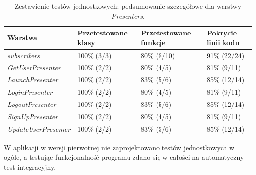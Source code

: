 \begin{table}[!htb]
\centering
\caption{Zestawienie testów jednostkowych: podsumowanie szczegółowe dla warstwy \textit{Presenters}.}
\label{tab:testy_jednostkowe_presenters}
\begin{tabular}{|l|l|l|l|}
\hline
\textbf{Warstwa} & \textbf{Przetestowane klasy} & \textbf{Przetestowane funkcje} & \textbf{Pokrycie linii kodu} \\ \hline
\textit{subscribers} & 100\% (3/3) & 80\% (8/10) & 91\% (22/24)	\\ \hline
\textit{GetUserPresenter} & 100\% (2/2) & 80\% (4/5) & 81\% (9/11)	\\ \hline
\textit{LaunchPresenter} & 100\% (2/2) & 83\% (5/6) & 85\% (12/14)	\\ \hline
\textit{LoginPresenter} & 100\% (2/2) & 80\% (4/5) & 81\% (9/11)	\\ \hline
\textit{LogoutPresenter} & 100\% (2/2) & 83\% (5/6) & 85\% (12/14)	\\ \hline
\textit{SignUpPresenter} & 100\% (2/2) & 80\% (4/5) & 81\% (9/11)	\\ \hline
\textit{UpdateUserPresenter} & 100\% (2/2) & 83\% (5/6) & 85\% (12/14)	\\ \hline
\end{tabular}
\end{table}

%
%

W aplikacji w wersji pierwotnej nie zaprojektowano testów jednostkowych w ogóle, a testując funkcjonalność programu zdano się w całości na automatyczny test integracyjny. 

